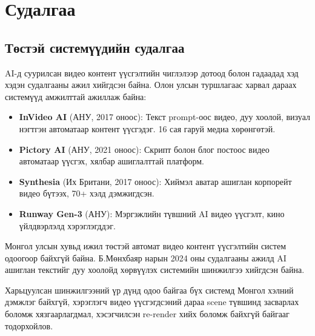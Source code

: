 
\chapter{Судалгаа}
\label{Chapter2}
\pagecolor{white}

\section{Төстэй системүүдийн судалгаа}

AI-д суурилсан видео контент үүсгэлтийн чиглэлээр дотоод болон гадаадад хэд хэдэн судалгааны ажил хийгдсэн байна. Олон улсын туршлагаас харвал дараах системүүд амжилттай ажиллаж байна:

\begin{itemize}
\item \textbf{InVideo AI} (АНУ, 2017 оноос): Текст prompt-оос видео, дуу хоолой, визуал нэгтгэн автоматаар контент үүсгэдэг. 16 сая гаруй медиа хөрөнгөтэй.
\item \textbf{Pictory AI} (АНУ, 2021 оноос): Скрипт болон блог постоос видео автоматаар үүсгэх, хялбар ашиглалттай платформ.
\item \textbf{Synthesia} (Их Британи, 2017 оноос): Хиймэл аватар ашиглан корпорейт видео бүтээх, 70+ хэлд дэмжигдсэн.
\item \textbf{Runway Gen-3} (АНУ): Мэргэжлийн түвшний AI видео үүсгэлт, кино үйлдвэрлэлд хэрэглэгддэг.
\end{itemize}

Монгол улсын хувьд ижил төстэй автомат видео контент үүсгэлтийн систем одоогоор байхгүй байна. Б.Мөнхбаяр нарын 2024 оны судалгааны ажилд AI ашиглан текстийг дуу хоолойд хөрвүүлэх системийн шинжилгээ хийгдсэн байна.

Харьцуулсан шинжилгээний үр дүнд одоо байгаа бүх системд Монгол хэлний дэмжлэг байхгүй, хэрэглэгч видео үүсгэгдсэний дараа scene түвшинд засварлах боломж хязгаарлагдмал, хэсэгчилсэн re-render хийх боломж байхгүй байгааг тодорхойлов.


